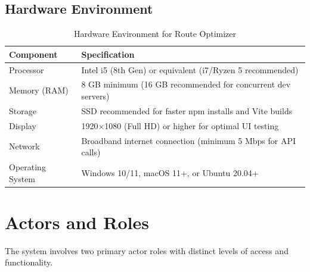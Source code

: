 \subsection{Hardware Environment}
\begin{table}[H]
    \centering
    \renewcommand{\arraystretch}{1.4}
    \begin{tabular}{|p{4cm}|p{9cm}|}
        \hline
        \textbf{Component} & \textbf{Specification} \\
        \hline
        Processor & Intel i5 (8th Gen) or equivalent (i7/Ryzen 5 recommended) \\
        \hline
        Memory (RAM) & 8 GB minimum (16 GB recommended for concurrent dev servers) \\
        \hline
        Storage & SSD recommended for faster npm installs and Vite builds \\
        \hline
        Display & 1920$\times$1080 (Full HD) or higher for optimal UI testing \\
        \hline
        Network & Broadband internet connection (minimum 5 Mbps for API calls) \\
        \hline
        Operating System & Windows 10/11, macOS 11+, or Ubuntu 20.04+ \\
        \hline
    \end{tabular}
    \caption{Hardware Environment for Route Optimizer}
    \label{tab:hardware_env}
\end{table}

\newpage
\section{Actors and Roles}
The system involves two primary actor roles with distinct levels of access and functionality.

